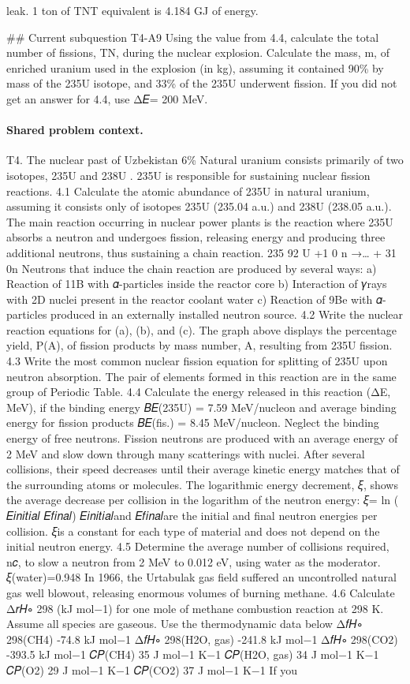 leak. 1 ton of TNT equivalent is 4.184 GJ of energy.

\#\# Current subquestion T4-A9
Using the value from 4.4, calculate the total number of fissions, TN, during the nuclear explosion. Calculate the mass, m, of enriched uranium used in the explosion (in kg), assuming it contained 90\% by mass of the 235U isotope, and 33\% of the 235U underwent fission. If you did not get an answer for 4.4, use Δ𝐸= 200 MeV.

\paragraph{Shared problem context.}
T4. The nuclear past of Uzbekistan 6\% Natural uranium consists primarily of two isotopes, 235U and 238U . 235U is responsible for sustaining nuclear fission reactions. 4.1 Calculate the atomic abundance of 235U in natural uranium, assuming it consists only of isotopes 235U (235.04 a.u.) and 238U (238.05 a.u.). The main reaction occurring in nuclear power plants is the reaction where 235U absorbs a neutron and undergoes fission, releasing energy and producing three additional neutrons, thus sustaining a chain reaction. 235 92 U +1 0 n →… + 31 0n Neutrons that induce the chain reaction are produced by several ways: a) Reaction of 11B with 𝛼-particles inside the reactor core b) Interaction of 𝛾rays with 2D nuclei present in the reactor coolant water c) Reaction of 9Be with 𝛼-particles produced in an externally installed neutron source. 4.2 Write the nuclear reaction equations for (a), (b), and (c). The graph above displays the percentage yield, P(A), of fission products by mass number, A, resulting from 235U fission. 4.3 Write the most common nuclear fission equation for splitting of 235U upon neutron absorption. The pair of elements formed in this reaction are in the same group of Periodic Table. 4.4 Calculate the energy released in this reaction (ΔE, MeV), if the binding energy 𝐵𝐸(235U) = 7.59 MeV/nucleon and average binding energy for fission products 𝐵𝐸(fis.) = 8.45 MeV/nucleon. Neglect the binding energy of free neutrons. Fission neutrons are produced with an average energy of 2 MeV and slow down through many scatterings with nuclei. After several collisions, their speed decreases until their average kinetic energy matches that of the surrounding atoms or molecules. The logarithmic energy decrement, 𝜉, shows the average decrease per collision in the logarithm of the neutron energy: 𝜉= ln ( 𝐸𝑖𝑛𝑖𝑡𝑖𝑎𝑙 𝐸𝑓𝑖𝑛𝑎𝑙) 𝐸𝑖𝑛𝑖𝑡𝑖𝑎𝑙and 𝐸𝑓𝑖𝑛𝑎𝑙are the initial and final neutron energies per collision. 𝜉is a constant for each type of material and does not depend on the initial neutron energy. 4.5 Determine the average number of collisions required, n𝑐, to slow a neutron from 2 MeV to 0.012 eV, using water as the moderator. 𝜉(water)=0.948 In 1966, the Urtabulak gas field suffered an uncontrolled natural gas well blowout, releasing enormous volumes of burning methane. 4.6 Calculate Δ𝑟𝐻∘ 298 (kJ mol−1) for one mole of methane combustion reaction at 298 K. Assume all species are gaseous. Use the thermodynamic data below Δ𝑓𝐻∘ 298(CH4) -74.8 kJ mol−1 Δ𝑓𝐻∘ 298(H2O, gas) -241.8 kJ mol−1 Δ𝑓𝐻∘ 298(CO2) -393.5 kJ mol−1 𝐶𝑃(CH4) 35 J mol−1 K−1 𝐶𝑃(H2O, gas) 34 J mol−1 K−1 𝐶𝑃(O2) 29 J mol−1 K−1 𝐶𝑃(CO2) 37 J mol−1 K−1 If you 